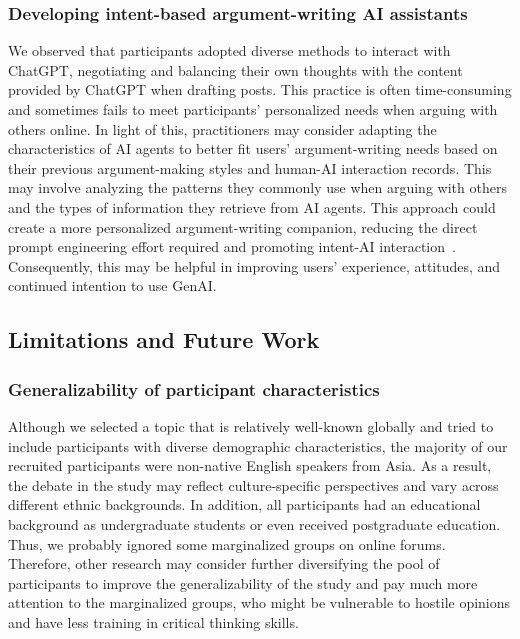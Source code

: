 \subsubsection{Developing intent-based argument-writing AI assistants}
We observed that participants adopted diverse methods to interact with ChatGPT, negotiating and balancing their own thoughts with the content provided by ChatGPT when drafting posts. This practice is often time-consuming and sometimes fails to meet participants' personalized needs when arguing with others online. In light of this, practitioners may consider adapting the characteristics of AI agents to better fit users' argument-writing needs based on their previous argument-making styles and human-AI interaction records. This may involve analyzing the patterns they commonly use when arguing with others and the types of information they retrieve from AI agents. This approach could create a more personalized argument-writing companion, reducing the direct prompt engineering effort required and promoting intent-AI interaction~\cite{ding_towards_2024}. Consequently, this may be helpful in improving users' experience, attitudes, and continued intention to use GenAI.


\subsection{Limitations and Future Work}

\subsubsection{Generalizability of participant characteristics}
Although we selected a topic that is relatively well-known globally and tried to include participants with diverse demographic characteristics, the majority of our recruited participants were non-native English speakers from Asia. As a result, the debate in the study may reflect culture-specific perspectives and vary across different ethnic backgrounds. In addition, all participants had an educational background as undergraduate students or even received postgraduate education. Thus, we probably ignored some marginalized groups on online forums. Therefore, other research may consider further diversifying the pool of participants to improve the generalizability of the study and pay much more attention to the marginalized groups, who might be vulnerable to hostile opinions and have less training in critical thinking skills.

